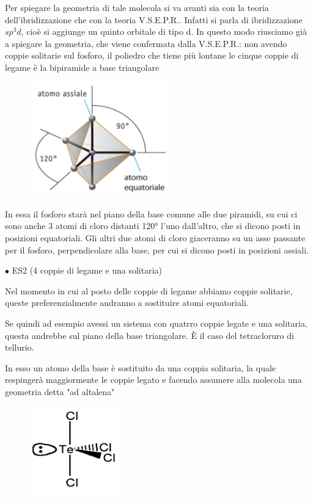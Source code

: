 Per spiegare la geometria di tale molecola si va avanti sia con la teoria dell'ibridizzazione che con la teoria V.S.E.P.R.. Infatti si parla di ibridizzazione $sp^3d$, cioè si aggiunge un quinto orbitale di tipo d. In questo modo riusciamo già a spiegare la geometria, che viene confermata dalla V.S.E.P.R.: non avendo coppie solitarie sul fosforo, il poliedro che tiene più lontane le cinque coppie di legame è la bipiramide a base triangolare
\begin{figure}[htp]
    \centering
    \includegraphics[width=6cm]{immagini/PCl_5.png}
\end{figure}
In essa il fosforo starà nel piano della base comune alle due piramidi, su cui ci sono anche 3 atomi di cloro distanti 120° l'uno dall'altro, che si dicono posti in posizioni equatoriali. Gli altri due atomi di cloro giaceranno su un asse passante per il fosforo, perpendicolare alla base, per cui si dicono posti in posizioni assiali.

$\bullet$ ES2  (4 coppie di legame e una solitaria)

Nel momento in cui al posto delle coppie di legame abbiamo coppie solitarie, queste preferenzialmente andranno a sostituire atomi equatoriali.

Se quindi ad esempio avessi un sistema con quatrro coppie legate e una solitaria, questa andrebbe sul piano della base triangolare. È il caso del tetracloruro di tellurio.

In esso un atomo della base è sostituito da una coppia solitaria, la quale respingerà maggiormente le coppie legato e facendo assumere alla molecola una geometria detta "ad altalena"

\begin{figure}[htp]
    \centering
    \includegraphics[width=4cm]{immagini/TeCl_4.png}
\end{figure}

